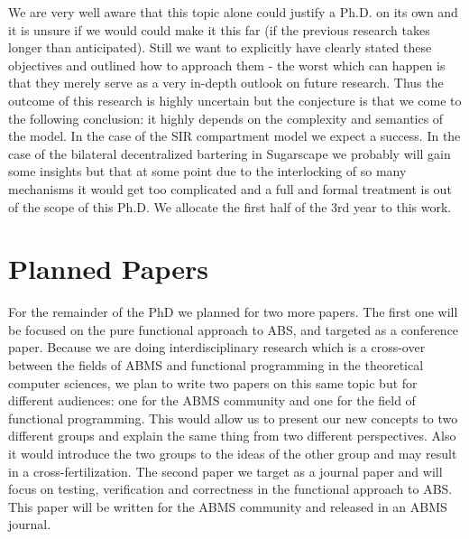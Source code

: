We are very well aware that this topic alone could justify a Ph.D. on its own and it is unsure if we would could make it this far (if the previous research takes longer than anticipated). Still we want to explicitly have clearly stated these objectives and outlined how to approach them - the worst which can happen is that they merely serve as a very in-depth outlook on future research.
Thus the outcome of this research is highly uncertain but the conjecture is that we come to the following conclusion: it highly depends on the complexity and semantics of the model. In the case of the SIR compartment model we expect a success. In the case of the bilateral decentralized bartering in Sugarscape we probably will gain some insights but that at some point due to the interlocking of so many mechanisms it would get too complicated and a full and formal treatment is out of the scope of this Ph.D.
We allocate the first half of the 3rd year to this work.

\section{Planned Papers}
For the remainder of the PhD we planned for two more papers.
The first one will be focused on the pure functional approach to ABS, and targeted as a conference paper. Because we are doing interdisciplinary research which is a cross-over between the fields of ABMS and functional programming in the theoretical computer sciences, we plan to write two papers on this same topic but for different audiences: one for the ABMS community and one for the field of functional programming. This would allow us to present our new concepts to two different groups and explain the same thing from two different perspectives. Also it would introduce the two groups to the ideas of the other group and may result in a cross-fertilization.
The second paper we target as a journal paper and will focus on testing, verification and correctness in the functional approach to ABS. This paper will be written for the ABMS community and released in an ABMS journal. 

